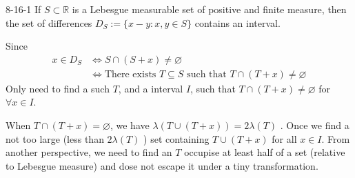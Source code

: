 \documentclass[../main.tex]{subfiles}
\begin{document}
\begin{lemma}{}{8-16-1}
If $S \subset \mathbb{R}$ is a Lebesgue measurable set of positive and finite measure, then the set of differences $D_S := \{x - y : x, y \in S\}$ contains an interval.
\end{lemma}
\begin{proofsketch}
    Since \[
    \begin{aligned}
    x \in D_{S}&\iff  S\cap \left( S+ x \right)
     \neq \varnothing\\ &\iff  \text{There exists } T\subseteq S\text{ such that }   T\cap \left(T+ x \right)\neq \varnothing    
    \end{aligned}
    \] Only need to find a such \(  T  \), and a interval \(  I  \), such that \(  T\cap \left( T+ x \right)\neq \varnothing   \) for \(  \forall x \in I  \).
    
    When \(  T\cap \left( T+ x \right)= \varnothing   \), we have \(   \lambda \left( T\cup \left( T+ x \right)  \right)= 2 \lambda \left( T \right)    \)  . Once we find a not too large (less than \(  2 \lambda \left( T \right)   \) ) set containing \(  T\cup \left( T+ x \right)   \) for all \(  x \in I  \).   From another perspective, we need to find an \(  T  \) occupise at least half of a set (relative to Lebesgue measure) and dose not escape it under a tiny transformation. 
\end{proofsketch}
\end{document}
